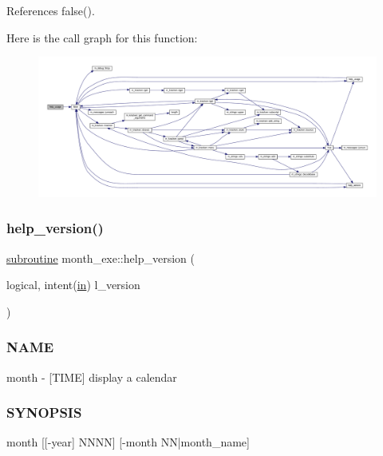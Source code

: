 References false().

Here is the call graph for this function\+:
\nopagebreak
\begin{figure}[H]
\begin{center}
\leavevmode
\includegraphics[width=350pt]{month_8f90_a59e45312af3c1c4bda229af348aaac1b_cgraph}
\end{center}
\end{figure}
\mbox{\label{month_8f90_ae30c982fccb720f9edefdd837baed72a}} 
\subsubsection{\texorpdfstring{help\+\_\+version()}{help\_version()}}
{\footnotesize\ttfamily \hyperlink{M__stopwatch_83_8txt_acfbcff50169d691ff02d4a123ed70482}{subroutine} month\+\_\+exe\+::help\+\_\+version (\begin{DoxyParamCaption}\item[{logical, intent(\hyperlink{M__journal_83_8txt_afce72651d1eed785a2132bee863b2f38}{in})}]{l\+\_\+version }\end{DoxyParamCaption})}



\subsubsection*{N\+A\+ME}

month -\/ \mbox{[}T\+I\+ME\mbox{]} display a calendar 

\subsubsection*{S\+Y\+N\+O\+P\+S\+IS}

\begin{DoxyVerb}month [[-year] NNNN] [-month NN|month_name]
\end{DoxyVerb}


